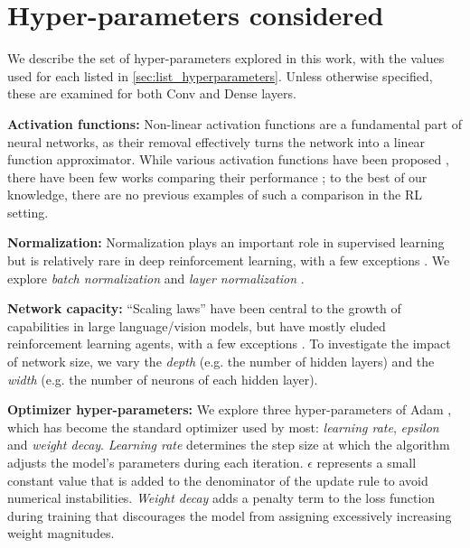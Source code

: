 \section{Hyper-parameters considered} 
\label{sec:hyper-parameter_selection}

We describe the set of hyper-parameters explored in this work, with the values used for each listed in \autoref{sec:list_hyperparameters}. Unless otherwise specified, these are examined for both Conv and Dense layers.

{\bf Activation functions:} 
Non-linear activation functions are a fundamental part of neural networks, as their removal effectively turns the network into a linear function approximator.
While various activation functions have been proposed \citep{devlin2019bert, Elfwing2018SigmoidWeightedLU, 10.5555/3305381.3305478}, there have been few works comparing their performance \citep{Shamir2020SmoothAA}; to the best of our knowledge, there are no previous examples of such a comparison in the RL setting.


{\bf Normalization: }
Normalization plays an important role in supervised learning \citep{tan2020efficientnet, xie2017aggregated} but is relatively rare in deep reinforcement learning, with a few exceptions \citep{gogianu2021spectral, bhatt2019crossnorm, arpit2019initialize, alphaZero}. We explore {\em batch normalization} \citep{ioffe2015batch} and {\em layer normalization} \citep{ba2016layer}.

{\bf Network capacity: } 
``Scaling laws'' have been central to the growth of capabilities in large language/vision models, but have mostly eluded reinforcement learning agents, with a few exceptions \citep{schwarzer23a, taiga2022investigating, farebrother2022proto,obando2024mixtures,obandoceron2024pruned,farebrother2024stop}. 
To investigate the impact of network size, we vary the {\em depth} (e.g. the number of hidden layers) and the {\em width} (e.g. the number of neurons of each hidden layer).

{\bf Optimizer hyper-parameters: }
\label{sec:optimizerHypers}
We explore three hyper-parameters of Adam \citep{kingma15adam}, which has become the standard optimizer used by most: {\em learning rate}, {\em epsilon} and {\em weight decay}.
\emph{Learning rate} determines the step size at which the algorithm adjusts the model's parameters during each iteration.
$\epsilon$ represents a small constant value that is added to the denominator of the update rule to avoid numerical instabilities.
\emph{Weight decay} adds a penalty term to the loss function during training that discourages the model from assigning excessively increasing weight magnitudes.


